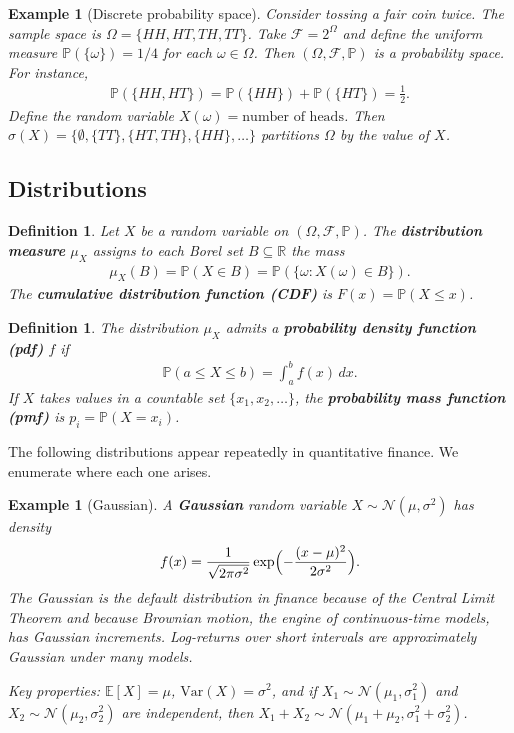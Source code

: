 \documentclass{report}
\theoremstyle{spacedplain}
\theoremstyle{spaceddefinition}
\newtheorem{definition}[theorem]{Definition}
\newtheorem{example}[theorem]{Example}
\theoremstyle{spacedremark}
\begin{document}
\begin{example}[Discrete probability space]
Consider tossing a fair coin twice. The sample space is $\Omega = \{HH, HT, TH, TT\}$. Take $\mathcal{F} = 2^\Omega$ and define the uniform measure $\mathbb{P}(\{\omega\}) = 1/4$ for each $\omega \in \Omega$. Then $(\Omega, \mathcal{F}, \mathbb{P})$ is a probability space. For instance,
\begin{align}
    \mathbb{P}(\{HH, HT\}) = \mathbb{P}(\{HH\}) + \mathbb{P}(\{HT\}) = \frac{1}{2}.
\end{align}
Define the random variable $X(\omega) = \text{number of heads}$. Then $\sigma(X) = \bigl\{\emptyset, \{TT\}, \{HT,TH\}, \{HH\}, \ldots\bigr\}$ partitions $\Omega$ by the value of $X$.
\end{example}

\subsection{Distributions}

\begin{definition}
Let $X$ be a random variable on $(\Omega, \mathcal{F}, \mathbb{P})$. The \textbf{distribution measure} $\mu_X$ assigns to each Borel set $B \subseteq \mathbb{R}$ the mass
\begin{align}
    \mu_X(B) = \mathbb{P}(X \in B) = \mathbb{P}(\{\omega : X(\omega) \in B\}).
\end{align}
The \textbf{cumulative distribution function (CDF)} is $F(x) = \mathbb{P}(X \leq x)$.
\end{definition}

\begin{definition}
The distribution $\mu_X$ admits a \textbf{probability density function (pdf)} $f$ if
\begin{align}
    \mathbb{P}(a \leq X \leq b) = \int_a^b f(x)\, dx.
\end{align}
If $X$ takes values in a countable set $\{x_1, x_2, \ldots\}$, the \textbf{probability mass function (pmf)} is $p_i = \mathbb{P}(X = x_i)$.
\end{definition}

The following distributions appear repeatedly in quantitative finance. We enumerate where each one arises.

\begin{example}[Gaussian]
A \textbf{Gaussian} random variable $X \sim \mathcal{N}(\mu, \sigma^2)$ has density
\begin{align}
    f(x) = \frac{1}{\sqrt{2\pi\sigma^2}}\exp\Bigl(-\frac{(x-\mu)^2}{2\sigma^2}\Bigr).
\end{align}
The Gaussian is the default distribution in finance because of the Central Limit Theorem and because Brownian motion, the engine of continuous-time models, has Gaussian increments. Log-returns over short intervals are approximately Gaussian under many models.

Key properties: $\mathbb{E}[X] = \mu$, $\text{Var}(X) = \sigma^2$, and if $X_1 \sim \mathcal{N}(\mu_1, \sigma_1^2)$ and $X_2 \sim \mathcal{N}(\mu_2, \sigma_2^2)$ are independent, then $X_1 + X_2 \sim \mathcal{N}(\mu_1 + \mu_2, \sigma_1^2 + \sigma_2^2)$.
\end{example}
\end{document}
